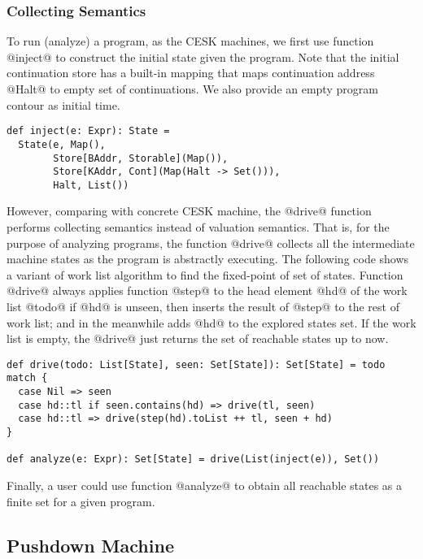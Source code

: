 \documentclass[acmsmall,review,anonymous]{acmart}\settopmatter{printfolios=true,printccs=false,printacmref=false}
\begin{document}
\subsubsection{Collecting Semantics}

To run (analyze) a program, as the CESK machines, we first use function @inject@ to construct
the initial state given the program. 
Note that the initial continuation store has a built-in mapping that maps continuation address
@Halt@ to empty set of continuations.
We also provide an empty program contour as initial time.
\begin{lstlisting}
def inject(e: Expr): State = 
  State(e, Map(), 
        Store[BAddr, Storable](Map()), 
        Store[KAddr, Cont](Map(Halt -> Set())), 
        Halt, List())
\end{lstlisting}

However, comparing with concrete CESK machine, the
@drive@ function performs collecting semantics instead of valuation
semantics. That is, for the purpose of analyzing programs, the function @drive@
collects all the intermediate machine states as the program is abstractly executing.
The following code shows a variant of work list algorithm to find the fixed-point 
of set of states.
Function @drive@ always applies function @step@ to the head element @hd@ of 
the work list @todo@ if @hd@ is unseen, then inserts the result of @step@ to 
the rest of work list; and in the meanwhile adds @hd@ to the explored states set.
If the work list is empty, the @drive@ just returns the set of reachable states 
up to now.

\begin{lstlisting}
def drive(todo: List[State], seen: Set[State]): Set[State] = todo match {
  case Nil => seen
  case hd::tl if seen.contains(hd) => drive(tl, seen)
  case hd::tl => drive(step(hd).toList ++ tl, seen + hd)
}

def analyze(e: Expr): Set[State] = drive(List(inject(e)), Set())
\end{lstlisting}

Finally, a user could use function @analyze@ to obtain all reachable states 
as a finite set for a given program.


\subsection{Pushdown Machine}
\end{document}
